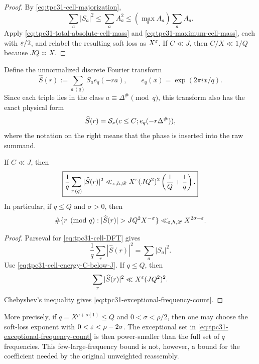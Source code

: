 \begin{proof}
By \eqref{eq:tpc31-cell-majorization},
\[
 \sum_a|S_a|^2
 \le\sum_aA_a^2
 \le(\max_aA_a)\sum_aA_a.
\]
Apply \eqref{eq:tpc31-total-absolute-cell-mass} and
\eqref{eq:tpc31-maximum-cell-mass}, each with $\varepsilon/2$, and relabel the
resulting soft loss as $X^\varepsilon$.  If $C\ll J$, then
$C/X\ll1/Q$ because $JQ\asymp X$.
\end{proof}

Define the unnormalized discrete Fourier transform
\begin{equation}
 \widehat S(r)
 :=\sum_{a\, (q)}S_a e_q(-ra),
 \qquad
 e_q(x)=\exp(2\pi i x/q).
 \label{eq:tpc31-cell-DFT}
\end{equation}
Since each triple lies in the class
$a\equiv\Delta^\#\pmod q$, this transform also has the exact physical
form
\begin{equation}
 \widehat S(r)
 =\mathcal S_\nu(c\le C; e_q(-r\Delta^\#)),
 \label{eq:tpc31-physical-frequency}
\end{equation}
where the notation on the right means that the phase is inserted into
the raw summand.

\begin{corollary}
\label{cor:tpc31-frequency-compression}
If $C\ll J$, then
\begin{equation}
 \boxed{
 \frac1q\sum_{r\, (q)}|\widehat S(r)|^2
 \ll_{\varepsilon,h,\mathscr D}X^\varepsilon(JQ^2)^2
 \left(\frac1Q+\frac1q\right).}
 \label{eq:tpc31-frequency-mean-square}
\end{equation}
In particular, if $q\le Q$ and $\sigma>0$, then
\begin{equation}
 \#\{r\pmod q:|\widehat S(r)|>JQ^2X^{-\sigma}\}
 \ll_{\eps,h,\mathscr D}X^{2\sigma+\eps}.
 \label{eq:tpc31-exceptional-frequency-count}
\end{equation}
\end{corollary}

\begin{proof}
Parseval for \eqref{eq:tpc31-cell-DFT} gives
\[
 \frac1q\sum_r|\widehat S(r)|^2=\sum_a|S_a|^2.
\]
Use \eqref{eq:tpc31-cell-energy-C-below-J}.  If $q\le Q$, then
\[
 \sum_r|\widehat S(r)|^2
 \ll X^\varepsilon(JQ^2)^2.
\]
Chebyshev's inequality gives
\eqref{eq:tpc31-exceptional-frequency-count}.
\end{proof}

More precisely, if $q=X^{\rho+o(1)}\le Q$ and
$0<\sigma<\rho/2$, then one may choose the soft-loss exponent with
$0<\varepsilon<\rho-2\sigma$.  The exceptional set in
\eqref{eq:tpc31-exceptional-frequency-count} is then power-smaller
than the full set of $q$ frequencies.  This few-large-frequency bound
is not, however, a bound for the coefficient needed by the original
unweighted reassembly.

